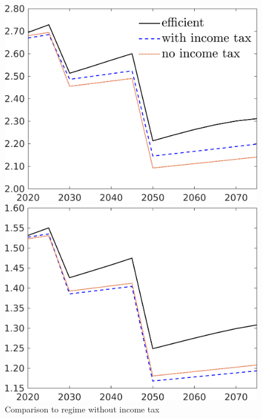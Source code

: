 \begin{figure}[h!!]
	\centering
	\caption{Comparison to regime without income tax }\label{fig:Compno_taul_prices}
	\begin{minipage}[]{0.24\textwidth}
		\includegraphics[width=1\textwidth]{../../codding_model/own_basedOnFried/optimalPol_elastS_DisuSci/figures/all_1705/wh_CompEffOPT_T_NoTaus_spillover0_sep1_BN0_ineq0_red0_etaa0.79_lgd1.png}
	\end{minipage}
	\begin{minipage}[]{0.24\textwidth}
		\includegraphics[width=1\textwidth]{../../codding_model/own_basedOnFried/optimalPol_elastS_DisuSci/figures/all_1705/wl_CompEffOPT_T_NoTaus_spillover0_sep1_BN0_ineq0_red0_etaa0.79_lgd0.png}

\end{minipage}
\end{figure}
